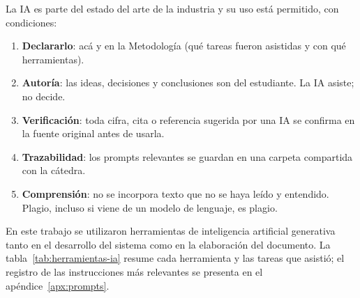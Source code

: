 
\begin{guia}
La IA es parte del estado del arte de la industria y su uso está
permitido, con condiciones:
\begin{enumerate}
    \item \textbf{Declararlo}: acá y en la Metodología (qué tareas fueron
          asistidas y con qué herramientas).
    \item \textbf{Autoría}: las ideas, decisiones y conclusiones son del
          estudiante. La IA asiste; no decide.
    \item \textbf{Verificación}: toda cifra, cita o referencia sugerida por
          una IA se confirma en la fuente original antes de usarla.
    \item \textbf{Trazabilidad}: los prompts relevantes se guardan en una
          carpeta compartida con la cátedra.
    \item \textbf{Comprensión}: no se incorpora texto que no se haya leído
          y entendido. Plagio, incluso si viene de un modelo de lenguaje,
          es plagio.
\end{enumerate}
\end{guia}


En este trabajo se utilizaron herramientas de inteligencia artificial
generativa tanto en el desarrollo del sistema como en la elaboración del
documento. La tabla~\ref{tab:herramientas-ia} resume cada herramienta y
las tareas que asistió; el registro de las instrucciones más relevantes
se presenta en el apéndice~\ref{apx:prompts}.

